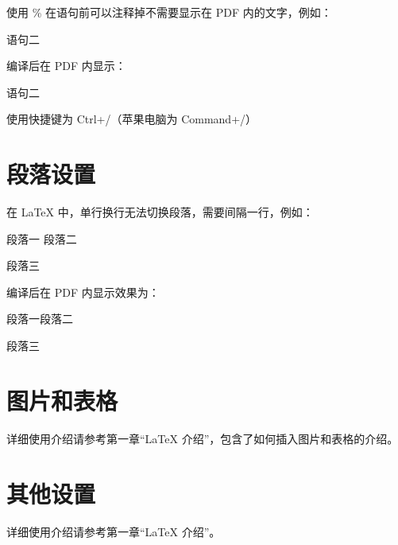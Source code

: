 使用 \% 在语句前可以注释掉不需要显示在 PDF 内的文字，例如：

\begin{python}
语句二
\end{python}

编译后在 PDF 内显示：

\begin{python}
语句二
\end{python}

使用快捷键为 Ctrl+/（苹果电脑为 Command+/）

\section{段落设置}

在 LaTeX 中，单行换行无法切换段落，需要间隔一行，例如：

\begin{python}
段落一
段落二

段落三
\end{python}

编译后在 PDF 内显示效果为：

\begin{python}
段落一段落二

段落三
\end{python}

\section{图片和表格}

详细使用介绍请参考第一章“\LaTeX{} 介绍”，包含了如何插入图片和表格的介绍。

\section{其他设置}

详细使用介绍请参考第一章“\LaTeX{} 介绍”。

